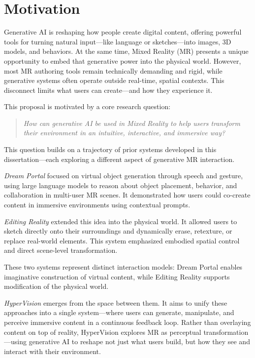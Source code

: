  \section{Motivation}
Generative AI is reshaping how people create digital content, offering powerful tools for turning natural input—like language or sketches—into images, 3D models, and behaviors. At the same time, Mixed Reality (MR) presents a unique opportunity to embed that generative power into the physical world. However, most MR authoring tools remain technically demanding and rigid, while generative systems often operate outside real-time, spatial contexts. This disconnect limits what users can create—and how they experience it.

This proposal is motivated by a core research question:

\begin{quote}
\textit{How can generative AI be used in Mixed Reality to help users transform their environment in an intuitive, interactive, and immersive way?}
\end{quote}

This question builds on a trajectory of prior systems developed in this dissertation—each exploring a different aspect of generative MR interaction.

\textit{Dream Portal} focused on virtual object generation through speech and gesture, using large language models to reason about object placement, behavior, and collaboration in multi-user MR scenes. It demonstrated how users could co-create content in immersive environments using contextual prompts.

\textit{Editing Reality} extended this idea into the physical world. It allowed users to sketch directly onto their surroundings and dynamically erase, retexture, or replace real-world elements. This system emphasized embodied spatial control and direct scene-level transformation.

These two systems represent distinct interaction models:
Dream Portal enables imaginative construction of virtual content,
while Editing Reality supports modification of the physical world.

\textit{HyperVision} emerges from the space between them. It aims to unify these approaches into a single system—where users can generate, manipulate, and perceive immersive content in a continuous feedback loop. Rather than overlaying content on top of reality, HyperVision explores MR as perceptual transformation—using generative AI to reshape not just what users build, but how they see and interact with their environment.

